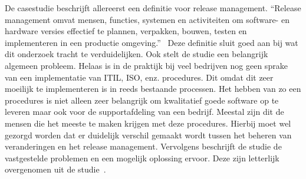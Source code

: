 De casestudie \autocite{Lahtela2011} beschrijft allereerst een definitie voor release management. “Release management omvat mensen, functies, systemen en activiteiten om software- en hardware versies effectief te plannen, verpakken, bouwen, testen en implementeren in een productie omgeving.”~\textcite{Lahtela2011} Deze definitie sluit goed aan bij wat dit onderzoek tracht te verduidelijken. Ook stelt de studie een belangrijk algemeen probleem. Helaas is in de praktijk bij veel bedrijven nog geen sprake van een implementatie van ITIL, ISO, enz. procedures. Dit omdat dit zeer moeilijk te implementeren is in reeds bestaande processen. Het hebben van zo een procedures is niet alleen zeer belangrijk om kwalitatief goede software op te leveren maar ook voor de supportafdeling van een bedrijf. Meestal zijn dit de mensen die het meeste te maken krijgen met deze procedures. Hierbij moet wel gezorgd worden dat er duidelijk verschil gemaakt wordt tussen het beheren van veranderingen en het release management. Vervolgens beschrijft de studie de vastgestelde problemen en een mogelijk oplossing ervoor. Deze zijn letterlijk overgenomen uit de studie~\textcite{Lahtela2011}.

